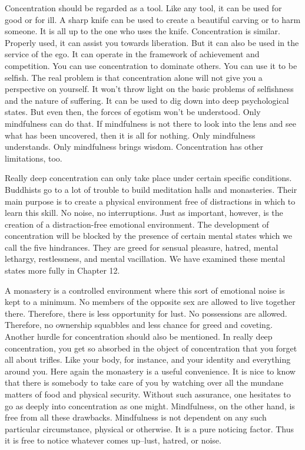 Concentration should be regarded as a tool. Like any tool, it can be used for
good or for ill. A sharp knife can be used to create a beautiful carving or to
harm someone. It is all up to the one who uses the knife. Concentration is
similar. Properly used, it can assist you towards liberation. But it can also be
used in the service of the ego. It can operate in the framework of achievement
and competition. You can use concentration to dominate others. You can use it to
be selfish. The real problem is that concentration alone will not give you a
perspective on yourself. It won't throw light on the basic problems of
selfishness and the nature of suffering. It can be used to dig down into deep
psychological states. But even then, the forces of egotism won't be understood.
Only mindfulness can do that. If mindfulness is not there to look into the lens
and see what has been uncovered, then it is all for nothing. Only mindfulness
understands. Only mindfulness brings wisdom. Concentration has other
limitations, too.

Really deep concentration can only take place under certain specific conditions.
Buddhists go to a lot of trouble to build meditation halls and monasteries.
Their main purpose is to create a physical environment free of distractions in
which to learn this skill. No noise, no interruptions. Just as important,
however, is the creation of a distraction-free emotional environment. The
development of concentration will be blocked by the presence of certain mental
states which we call the five hindrances. They are greed for sensual pleasure,
hatred, mental lethargy, restlessness, and mental vacillation. We have examined
these mental states more fully in Chapter 12.

A monastery is a controlled environment where this sort of emotional noise is
kept to a minimum. No members of the opposite sex are allowed to live together
there. Therefore, there is less opportunity for lust. No possessions are
allowed. Therefore, no ownership squabbles and less chance for greed and
coveting. Another hurdle for concentration should also be mentioned. In really
deep concentration, you get so absorbed in the object of concentration that you
forget all about trifles. Like your body, for instance, and your identity and
everything around you. Here again the monastery is a useful convenience. It is
nice to know that there is somebody to take care of you by watching over all the
mundane matters of food and physical security. Without such assurance, one
hesitates to go as deeply into concentration as one might.  Mindfulness, on the
other hand, is free from all these drawbacks. Mindfulness is not dependent on
any such particular circumstance, physical or otherwise. It is a pure noticing
factor. Thus it is free to notice whatever comes up--lust, hatred, or noise.

